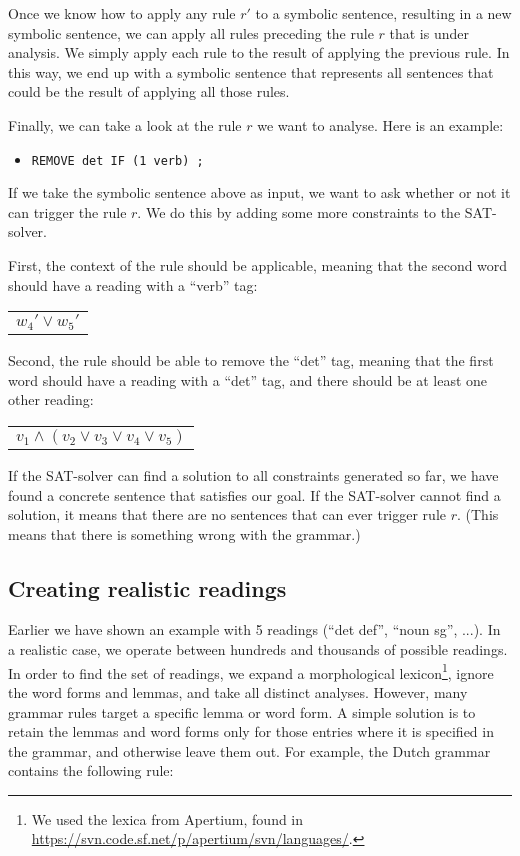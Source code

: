 Once we know how to apply any rule $r'$ to a symbolic sentence, resulting in a new symbolic sentence, we can apply all rules preceding the rule $r$ that is under analysis. We simply apply each rule to the result of applying the previous rule. In this way, we end up with a symbolic sentence that represents all sentences that could be the result of applying all those rules.

Finally, we can take a look at the rule $r$ we want to analyse. Here is an example:
\begin{itemize}
\item[] \texttt{REMOVE det IF (1 verb) ;}
\end{itemize}
If we take the symbolic sentence above as input, we want to ask whether or not it can trigger the rule $r$. We do this by adding some more constraints to the SAT-solver.

First, the context of the rule should be applicable, meaning that the second word should have a reading with a ``verb'' tag:
\begin{center}
\begin{tabular}{c}
$w_4' \vee w_5'$
\end{tabular}
\end{center}
Second, the rule should be able to remove the ``det'' tag, meaning that the first word should have a reading with a ``det'' tag, and there should be at least one other reading:
\begin{center}
\begin{tabular}{c}
$v_1 \wedge (v_2 \vee v_3 \vee v_4 \vee v_5)$
\end{tabular}
\end{center}
If the SAT-solver can find a solution to all constraints generated so far, we have found a concrete sentence that satisfies our goal. If the SAT-solver cannot find a solution, it means that there are no sentences that can ever trigger rule $r$. (This means that there is something wrong with the grammar.)

\subsection{Creating realistic readings}
\label{sec:realistic_readings}

Earlier we have shown an example with 5 readings (``det def'', ``noun sg'', ...). In a realistic case, we operate between hundreds and thousands of possible readings. 
In order to find the set of readings, we expand a morphological lexicon\footnote{We used the lexica from Apertium, found in \url{https://svn.code.sf.net/p/apertium/svn/languages/}.}, ignore the word forms and lemmas, and take all distinct analyses. 
However, many grammar rules target a specific lemma or word form.
A simple solution is to retain the lemmas and word forms only for those entries where it is specified in the grammar, and otherwise leave them out. For example, the Dutch grammar contains the following rule:

